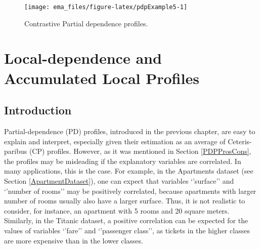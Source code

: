 \documentclass[]{krantz}
\newenvironment{Shaded}{\begin{snugshade}}{\end{snugshade}}
\newcommand{\DataTypeTok}[1]{\textcolor[rgb]{0.13,0.29,0.53}{#1}}
\newcommand{\KeywordTok}[1]{\textcolor[rgb]{0.13,0.29,0.53}{\textbf{#1}}}
\newcommand{\NormalTok}[1]{#1}
\newcommand{\OperatorTok}[1]{\textcolor[rgb]{0.81,0.36,0.00}{\textbf{#1}}}
\newcommand{\StringTok}[1]{\textcolor[rgb]{0.31,0.60,0.02}{#1}}
\begin{document}
\begin{Shaded}
\end{Shaded}

\begin{figure}

{\centering \texttt{[image: ema\_files/figure-latex/pdpExample5-1]} 

}

\caption{Contrastive Partial dependence profiles.}\label{fig:pdpExample5}
\end{figure}

\hypertarget{accumulatedLocalProfiles}{%
\chapter{Local-dependence and Accumulated Local Profiles}\label{accumulatedLocalProfiles}}

\hypertarget{ALPIntro}{%
\section{Introduction}\label{ALPIntro}}

Partial-dependence (PD) profiles, introduced in the previous chapter, are easy to explain and interpret, especially given their estimation as an average of Ceteris-paribus (CP) profiles. However, as it was mentioned in Section \ref{PDPProsCons}, the profiles may be misleading if the explanatory variables are correlated. In many applications, this is the case. For example, in the Apartments dataset (see Section \ref{ApartmentDataset}), one can expect that variables `'surface'' and `'number of rooms'' may be positively correlated, because apartments with larger number of rooms usually also have a larger surface. Thus, it is not realistic to consider, for instance, an apartment with 5 rooms and 20 square meters. Similarly, in the Titanic dataset, a positive correlation can be expected for the values of variables `'fare'' and `'passenger class'', as tickets in the higher classes are more expensive than in the lower classes.
\end{document}

